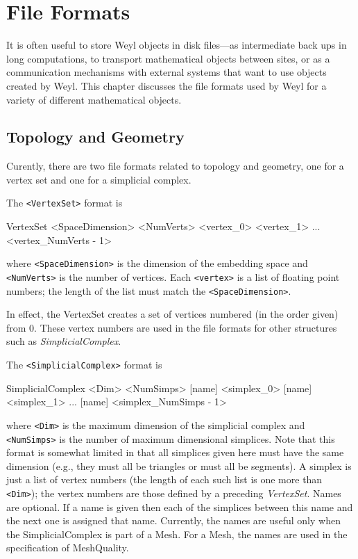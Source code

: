 
\chapter{File Formats}
\label{FileFormats:Chap}

It is often useful to store Weyl objects in disk files---as
intermediate back ups in long computations, to transport mathematical
objects between sites, or as a communication mechanisms with external
systems that want to use objects created by Weyl.  This chapter
discusses the file formats used by Weyl for a variety of different
mathematical objects.

\section{Topology and Geometry}
\label{TopologyFF:Sec}

Curently, there are two file formats related to topology and geometry,
one for a vertex set and one for a simplicial complex.

The \verb+<VertexSet>+ format is

\begin{code}
VertexSet <SpaceDimension> <NumVerts>
<vertex_0>
<vertex_1>
...
<vertex_{NumVerts - 1}>
\end{code}
\noindent
where \verb+<SpaceDimension>+ is the dimension of the embedding space
and \verb+<NumVerts>+ is the number of vertices.  Each \verb+<vertex>+
is a list of floating point numbers; the length of the list must match
the \verb+<SpaceDimension>+.  

In effect, the VertexSet creates a set of vertices numbered (in the
order given) from 0.  These vertex numbers are used in the file
formats for other structures such as {\em SimplicialComplex}.

The \verb+<SimplicialComplex>+ format is

\begin{code}
SimplicialComplex <Dim> <NumSimps>
[name]
<simplex_0>
[name]
<simplex_1> 
...
[name]
<simplex_{NumSimps - 1}> 
\end{code}
\noindent
where \verb+<Dim>+ is the maximum dimension of the simplicial complex
and \verb+<NumSimps>+ is the number of maximum dimensional simplices.
Note that this format is somewhat limited in that all simplices given
here must have the same dimension (e.g., they must all be triangles or
must all be segments).  A simplex is just a list of vertex numbers
(the length of each such list is one more than \verb+<Dim>+); the
vertex numbers are those defined by a preceding {\em VertexSet}.
Names are optional.  If a name is given then each of the simplices
between this name and the next one is assigned that name.  Currently,
the names are useful only when the SimplicialComplex is part of a
Mesh.  For a Mesh, the names are used in the specification of
MeshQuality.

